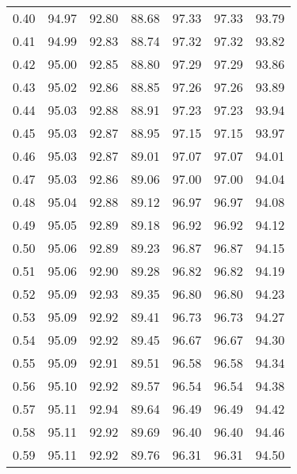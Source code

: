 \begin{tabular}{|c|c|c|c|c|c|c|}
      0.40 &     94.97 &     92.80 &      88.68 &   97.33 &      97.33 &         93.79 \\
      0.41 &     94.99 &     92.83 &      88.74 &   97.32 &      97.32 &         93.82 \\
      0.42 &     95.00 &     92.85 &      88.80 &   97.29 &      97.29 &         93.86 \\
      0.43 &     95.02 &     92.86 &      88.85 &   97.26 &      97.26 &         93.89 \\
      0.44 &     95.03 &     92.88 &      88.91 &   97.23 &      97.23 &         93.94 \\
      0.45 &     95.03 &     92.87 &      88.95 &   97.15 &      97.15 &         93.97 \\
      0.46 &     95.03 &     92.87 &      89.01 &   97.07 &      97.07 &         94.01 \\
      0.47 &     95.03 &     92.86 &      89.06 &   97.00 &      97.00 &         94.04 \\
      0.48 &     95.04 &     92.88 &      89.12 &   96.97 &      96.97 &         94.08 \\
      0.49 &     95.05 &     92.89 &      89.18 &   96.92 &      96.92 &         94.12 \\
      0.50 &     95.06 &     92.89 &      89.23 &   96.87 &      96.87 &         94.15 \\
      0.51 &     95.06 &     92.90 &      89.28 &   96.82 &      96.82 &         94.19 \\
      0.52 &     95.09 &     92.93 &      89.35 &   96.80 &      96.80 &         94.23 \\
      0.53 &     95.09 &     92.92 &      89.41 &   96.73 &      96.73 &         94.27 \\
      0.54 &     95.09 &     92.92 &      89.45 &   96.67 &      96.67 &         94.30 \\
      0.55 &     95.09 &     92.91 &      89.51 &   96.58 &      96.58 &         94.34 \\
      0.56 &     95.10 &     92.92 &      89.57 &   96.54 &      96.54 &         94.38 \\
      0.57 &     95.11 &     92.94 &      89.64 &   96.49 &      96.49 &         94.42 \\
      0.58 &     95.11 &     92.92 &      89.69 &   96.40 &      96.40 &         94.46 \\
      0.59 &     95.11 &     92.92 &      89.76 &   96.31 &      96.31 &         94.50 \\

\end{tabular}
